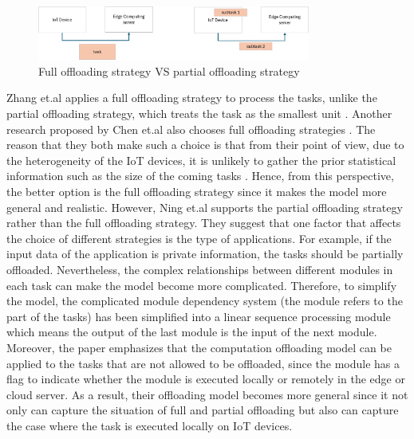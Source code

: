 \documentclass[a4paper,11pt]{article}
\begin{document}
\begin{figure}[h]
        \centering
        \includegraphics[width=0.8\textwidth]{offloading.png}
        \caption{Full offloading strategy VS partial offloading strategy}
\end{figure}

Zhang et.al applies a full offloading strategy to process the tasks, unlike the partial offloading strategy, which treats the task as the smallest unit \cite{no_cloud_1_density}. Another research proposed by Chen et.al also chooses full offloading strategies \cite{full_offload_2}. The reason that they both make such a choice is that from their point of view, due to the heterogeneity of the IoT devices, it is unlikely to gather the prior statistical information such as the size of the coming tasks \cite{no_cloud_1_density,full_offload_2}. Hence, from this perspective, the better option is the full offloading strategy since it makes the model more general and realistic. %
\newline\newline
However, Ning et.al \cite{A_Cooperative_Partial_Computation_Offloading_Scheme_for_Mobile_Edge} supports the partial offloading strategy rather than the full offloading strategy. They suggest that one factor that affects the choice of different strategies is the type of applications. For example, if the input data of the application is private information, the tasks should be partially offloaded. Nevertheless, the complex relationships between different modules in each task can make the model become more complicated. Therefore, to simplify the model, the complicated module dependency system (the module refers to the part of the tasks) has been simplified into a linear sequence processing module which means the output of the last module is the input of the next module. Moreover, the paper emphasizes that the computation offloading model can be applied to the tasks that are not allowed to be offloaded, since the module has a flag to indicate whether the module is executed locally or remotely in the edge or cloud server. As a result, their offloading model becomes more general since it not only can capture the situation of full and partial offloading but also can capture the case where the task is executed locally on IoT devices.
\end{document}
